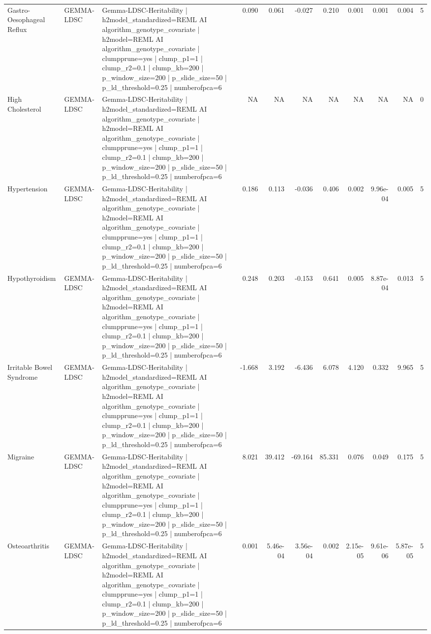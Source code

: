 \begin{landscape}
\begin{longtable}{p{2.4cm}p{1.8cm}p{6.0cm}rrrrrrrr}
Gastro-Oesophageal Reflux & GEMMA-LDSC & Gemma-LDSC-Heritability | h2model\_standardized=REML AI algorithm\_genotype\_covariate | h2model=REML AI algorithm\_genotype\_covariate | clumpprune=yes | clump\_p1=1 | clump\_r2=0.1 | clump\_kb=200 | p\_window\_size=200 | p\_slide\_size=50 | p\_ld\_threshold=0.25 | numberofpca=6 & 0.090 & 0.061 & -0.027 & 0.210 & 0.001 & 0.001 & 0.004 & 5 \\
High Cholesterol & GEMMA-LDSC & Gemma-LDSC-Heritability | h2model\_standardized=REML AI algorithm\_genotype\_covariate | h2model=REML AI algorithm\_genotype\_covariate | clumpprune=yes | clump\_p1=1 | clump\_r2=0.1 | clump\_kb=200 | p\_window\_size=200 | p\_slide\_size=50 | p\_ld\_threshold=0.25 | numberofpca=6 & NA & NA & NA & NA & NA & NA & NA & 0 \\
Hypertension & GEMMA-LDSC & Gemma-LDSC-Heritability | h2model\_standardized=REML AI algorithm\_genotype\_covariate | h2model=REML AI algorithm\_genotype\_covariate | clumpprune=yes | clump\_p1=1 | clump\_r2=0.1 | clump\_kb=200 | p\_window\_size=200 | p\_slide\_size=50 | p\_ld\_threshold=0.25 | numberofpca=6 & 0.186 & 0.113 & -0.036 & 0.406 & 0.002 & 9.96e-04 & 0.005 & 5 \\
Hypothyroidism & GEMMA-LDSC & Gemma-LDSC-Heritability | h2model\_standardized=REML AI algorithm\_genotype\_covariate | h2model=REML AI algorithm\_genotype\_covariate | clumpprune=yes | clump\_p1=1 | clump\_r2=0.1 | clump\_kb=200 | p\_window\_size=200 | p\_slide\_size=50 | p\_ld\_threshold=0.25 | numberofpca=6 & 0.248 & 0.203 & -0.153 & 0.641 & 0.005 & 8.87e-04 & 0.013 & 5 \\
Irritable Bowel Syndrome & GEMMA-LDSC & Gemma-LDSC-Heritability | h2model\_standardized=REML AI algorithm\_genotype\_covariate | h2model=REML AI algorithm\_genotype\_covariate | clumpprune=yes | clump\_p1=1 | clump\_r2=0.1 | clump\_kb=200 | p\_window\_size=200 | p\_slide\_size=50 | p\_ld\_threshold=0.25 | numberofpca=6 & -1.668 & 3.192 & -6.436 & 6.078 & 4.120 & 0.332 & 9.965 & 5 \\
Migraine & GEMMA-LDSC & Gemma-LDSC-Heritability | h2model\_standardized=REML AI algorithm\_genotype\_covariate | h2model=REML AI algorithm\_genotype\_covariate | clumpprune=yes | clump\_p1=1 | clump\_r2=0.1 | clump\_kb=200 | p\_window\_size=200 | p\_slide\_size=50 | p\_ld\_threshold=0.25 | numberofpca=6 & 8.021 & 39.412 & -69.164 & 85.331 & 0.076 & 0.049 & 0.175 & 5 \\
Osteoarthritis & GEMMA-LDSC & Gemma-LDSC-Heritability | h2model\_standardized=REML AI algorithm\_genotype\_covariate | h2model=REML AI algorithm\_genotype\_covariate | clumpprune=yes | clump\_p1=1 | clump\_r2=0.1 | clump\_kb=200 | p\_window\_size=200 | p\_slide\_size=50 | p\_ld\_threshold=0.25 | numberofpca=6 & 0.001 & 5.46e-04 & 3.56e-04 & 0.002 & 2.15e-05 & 9.61e-06 & 5.87e-05 & 5 \\

\end{longtable}
\end{landscape}
